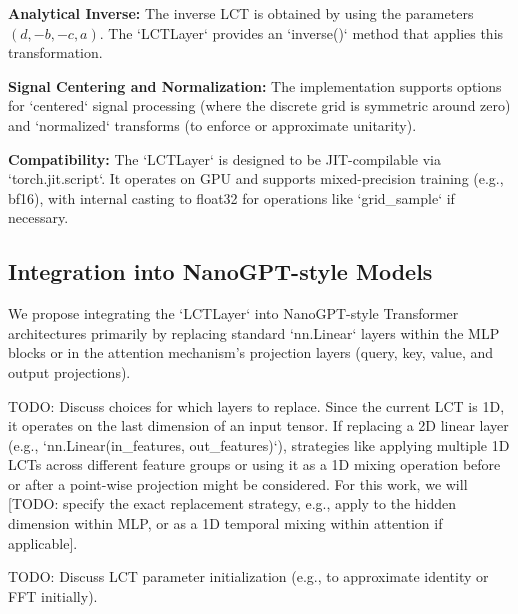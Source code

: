 \textbf{Analytical Inverse:} The inverse LCT is obtained by using the parameters \((d, -b, -c, a)\). The `LCTLayer` provides an `inverse()` method that applies this transformation.

\textbf{Signal Centering and Normalization:} The implementation supports options for `centered` signal processing (where the discrete grid is symmetric around zero) and `normalized` transforms (to enforce or approximate unitarity).

\textbf{Compatibility:} The `LCTLayer` is designed to be JIT-compilable via `torch.jit.script`. It operates on GPU and supports mixed-precision training (e.g., bf16), with internal casting to float32 for operations like `grid_sample` if necessary.

\subsection{Integration into NanoGPT-style Models}
We propose integrating the `LCTLayer` into NanoGPT-style Transformer architectures primarily by replacing standard `nn.Linear` layers within the MLP blocks or in the attention mechanism's projection layers (query, key, value, and output projections).

TODO: Discuss choices for which layers to replace. Since the current LCT is 1D, it operates on the last dimension of an input tensor. If replacing a 2D linear layer (e.g., `nn.Linear(in_features, out_features)`), strategies like applying multiple 1D LCTs across different feature groups or using it as a 1D mixing operation before or after a point-wise projection might be considered. For this work, we will [TODO: specify the exact replacement strategy, e.g., apply to the hidden dimension within MLP, or as a 1D temporal mixing within attention if applicable].

TODO: Discuss LCT parameter initialization (e.g., to approximate identity or FFT initially).